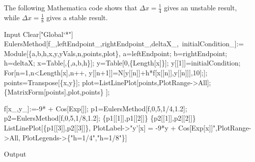 \documentclass[10pt,twoside,openany]{memoir}
\begin{document}
    \begin{mdframed}
    \begin{solution}
        The following Mathematica code shows that $\Delta x = \frac{1}{4}$ gives an unstable result, while $\Delta x = \frac{1}{8}$ gives a stable result.

        \begin{mmaCell}[addtoindex=125,moredefined={EulersMethod, f, p1, p2, \
            CellToTeX},morepattern={f_, leftEndpoint_, rightEndpoint_, deltaX_, \
            initialCondition_,
            leftEndpoint, rightEndpoint, deltaX, initialCondition, x_, y_, \
            cell},morelocal={a, b, h, x, y, yVals, n, points, plot}]{Input}
Clear["Global`*"]
EulersMethod[f_,leftEndpoint_,rightEndpoint_,deltaX_,\
    initialCondition_]:=
   Module[\{a,b,h,x,y,yVals,n,points,plot\},
    a=leftEndpoint;
    b=rightEndpoint;
    h=deltaX;
    x=Table[\mmaFnc{x},\{\mmaFnc{x},a,b,h\}];
    y=Table[0,\{Length[x]\}];
    y[[1]]=initialCondition;
    For[n=1,n<Length[x],n++,
     y[[n+1]]=N[y[[n]]+h*f[x[[n]],y[[n]]],10];];
    points=Transpose[\{x,y\}];
    plot=ListLinePlot[points,PlotRange->All];
    \{MatrixForm[points],plot,points\}
];

f[x_,y_]:=-9*\mmaPat{y} + Cos[Exp[\mmaPat{x}]];
p1=EulersMethod[f,0,5,1/4,1.2];
p2=EulersMethod[f,0,5,1/8,1.2];
\{p1[[1]],p1[[2]]\}
\{p2[[1]],p2[[2]]\}
ListLinePlot[\{p1[[3]],p2[[3]]\},
  PlotLabel->"y'[x] = -9*y + Cos[Exp[x]]",PlotRange->All,
  PlotLegends->\{"h=1/4","h=1/8"\}]
            \end{mmaCell}

\begin{mmaCell}{Output}
    
\end{mmaCell}


\end{solution}
\end{mdframed}
\end{document}
